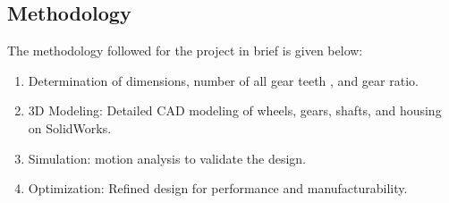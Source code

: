 \documentclass[../../main]{subfiles}
\begin{document}

    
    
    
    
    



\subsection{Methodology}

The methodology followed for the project in brief is given below:

\begin{enumerate}
\def\labelenumi{\arabic{enumi}.}
\item
  Determination of dimensions, number of all gear teeth , and gear
  ratio.
\item
  3D Modeling: Detailed CAD modeling of wheels, gears, shafts, and
  housing on SolidWorks.
\item
  Simulation: motion analysis to validate the design.
\item
  Optimization: Refined design for performance and manufacturability.
\end{enumerate}
\end{document}
